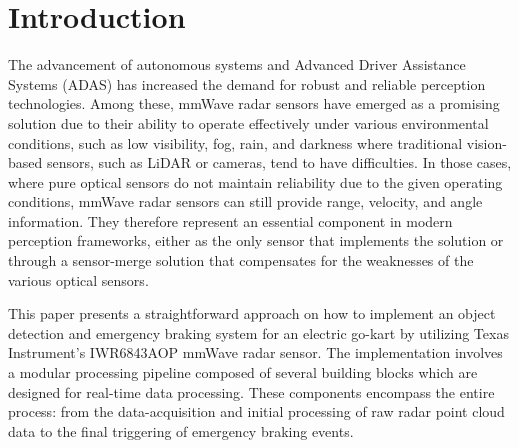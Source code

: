 \section{Introduction}
\label{sec:intoduction}

The advancement of autonomous systems and Advanced Driver Assistance Systems (ADAS) has increased the demand for robust and reliable perception technologies.
Among these, mmWave radar sensors have emerged as a promising solution due to their ability to operate effectively under various environmental conditions, such as low visibility, fog, rain, and darkness where traditional vision-based sensors, such as LiDAR or cameras, tend to have difficulties.
In those cases, where pure optical sensors do not maintain reliability due to the given operating conditions, mmWave radar sensors can still provide range, velocity, and angle information.
They therefore represent an essential component in modern perception frameworks, either as the only sensor that implements the solution or through a sensor-merge solution that compensates for the weaknesses of the various optical sensors.
\par


This paper presents a straightforward approach on how to implement an object detection and emergency braking system for an electric go-kart by utilizing Texas Instrument's IWR6843AOP mmWave radar sensor.
The implementation involves a modular processing pipeline composed of several building blocks which are designed for real-time data processing.
These components encompass the entire process: from the data-acquisition and initial processing of raw radar point cloud data to the final triggering of emergency braking events.

